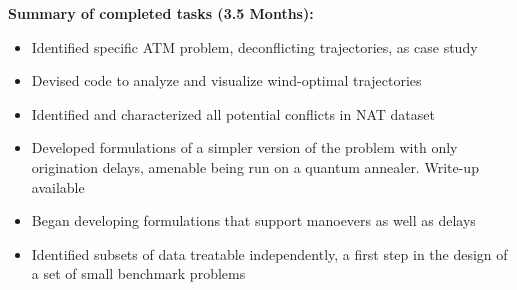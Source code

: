 \begin{center}
\colorbox{green!10}{
  \begin{minipage}[t]{0.9\columnwidth}
    \textbf{Summary of completed tasks (3.5 Months):}
      \begin{itemize}[leftmargin=0.5cm]
        \itemsep-0.5em
	\item Identified specific ATM problem, deconflicting trajectories, as case study
        \item Devised code to analyze and visualize wind-optimal trajectories
        \item Identified and characterized all potential conflicts in NAT dataset
        \item Developed formulations of a simpler version of the problem 
with only origination delays, amenable being run on a quantum annealer. Write-up available
        \item Began developing formulations that support manoevers as well
as delays
	\item Identified subsets of data treatable independently, a
first step in the design of a set of small benchmark problems
      \end{itemize}
 \end{minipage}
}
\end{center}
